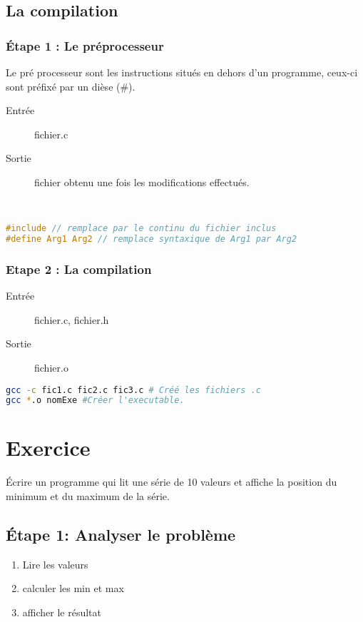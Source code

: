 \documentclass[12pt,a4paper,openany]{book}
\begin{document}
\section{La compilation}
\subsection{\'Etape 1 : Le préprocesseur}
Le pré processeur sont les instructions situés en dehors d'un programme, ceux-ci sont préfixé par un dièse (\#).
\begin{description}
	\item[Entrée] fichier.c
	\item[Sortie] fichier obtenu une fois les modifications effectués.
\end{description}~
\begin{lstlisting}[language=C, caption=Exemple d'instructions pré-processeurs]
#include // remplace par le continu du fichier inclus
#define Arg1 Arg2 // remplace syntaxique de Arg1 par Arg2
\end{lstlisting}
\newpage
\subsection{Etape 2 : La compilation}
\begin{description}
	\item[Entrée] fichier.c, fichier.h
	\item[Sortie] fichier.o 
\end{description}
\begin{lstlisting}[language=bash]
gcc -c fic1.c fic2.c fic3.c # Créé les fichiers .c
gcc *.o nomExe #Créer l'executable.
\end{lstlisting}
\chapter{Exercice}
\'Ecrire un programme qui lit une série de 10 valeurs et affiche la position du minimum et du maximum de la série.
\section{\'Etape 1: Analyser le problème}
\begin{enumerate}
	\item Lire les valeurs
	\item calculer les min et max
	\item afficher le résultat
\end{enumerate}
\end{document}
